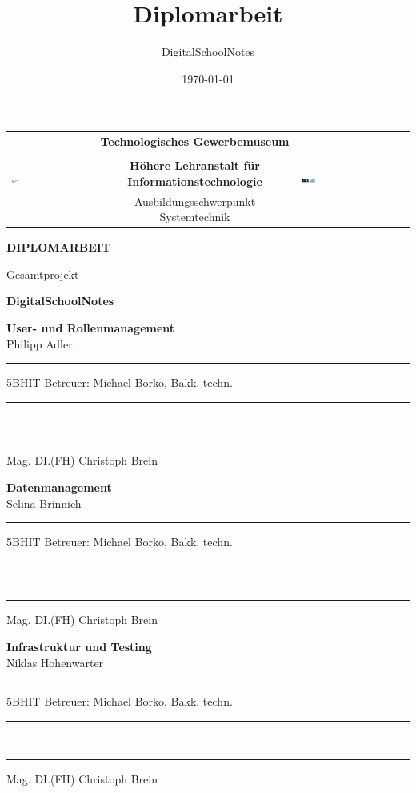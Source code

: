 \documentclass[a4paper,12pt,twoside,openany]{book}
\title{Diplomarbeit}
\author{DigitalSchoolNotes}
\date{\today}
\newcommand\blankpage{%
    \null
    \thispagestyle{empty}%
    \addtocounter{page}{-1}%
    \newpage}
\begin{document}
\afterpage{\blankpage}

\begin{titlepage}
\begin{center}

\setlength{\arrayrulewidth}{0.3mm}
\begin{table}[]
\centering
\begin{tabular}{lcl}
\multirow{4}{*}{
\includegraphics[width=0.15\textwidth]{images/tgm_logo}} & \textbf{\Large Technologisches Gewerbemuseum}                  & \multirow{4}{*}{\includegraphics[width=0.12\textwidth]{images/htl_logo}} \\
                           & &\\ & \textbf{Höhere Lehranstalt für Informationstechnologie} &                   \\
                           & Ausbildungsschwerpunkt Systemtechnik                    &                  \\\hline
\end{tabular}
\end{table}

\textbf{\LARGE DIPLOMARBEIT}

\vspace{5mm}

Gesamtprojekt

\textbf{\Large DigitalSchoolNotes}

\vspace{15mm}

\end{center}

\textbf{User- und Rollenmanagement}\\
Philipp Adler \rule[-0.2cm]{1.3cm}{0pt} 5BHIT \hfill Betreuer: Michael Borko, Bakk. techn. \rule[-0.2cm]{0.4cm}{0pt}\\
\rule[-0.2cm]{9.8cm}{0pt} Mag. DI.(FH) Christoph Brein

\textbf{Datenmanagement}\\
Selina Brinnich \rule[-0.2cm]{1cm}{0pt} 5BHIT \hfill Betreuer: Michael Borko, Bakk. techn. \rule[-0.2cm]{0.4cm}{0pt}\\
\rule[-0.2cm]{9.8cm}{0pt} Mag. DI.(FH) Christoph Brein

\textbf{Infrastruktur und Testing}\\
Niklas Hohenwarter \rule[-0.2cm]{0.2cm}{0pt} 5BHIT \hfill Betreuer: Michael Borko, Bakk. techn. \rule[-0.2cm]{0.4cm}{0pt}\\
\rule[-0.2cm]{9.8cm}{0pt} Mag. DI.(FH) Christoph Brein


\end{titlepage}
\end{document}
